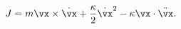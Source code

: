 \begin{equation}
     J=m\vx\times\dot{\vx}+\frac{\kappa}{2}\dot{\vx}\strut^2
     -\kappa\vx\cdot\ddot{\vx}.
     \label{angmom}
\end{equation}

